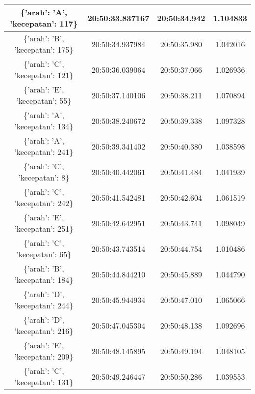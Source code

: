\begin{longtable}{|ccc|c|}
    \multicolumn{1}{|c|}{\{'arah': 'A', 'kecepatan': 117\}} & \multicolumn{1}{c|}{20:50:33.837167} & 20:50:34.942       & 1.104833    \\ \hline
    \multicolumn{1}{|c|}{\{'arah': 'B', 'kecepatan': 175\}} & \multicolumn{1}{c|}{20:50:34.937984} & 20:50:35.980       & 1.042016    \\ \hline
    \multicolumn{1}{|c|}{\{'arah': 'C', 'kecepatan': 121\}} & \multicolumn{1}{c|}{20:50:36.039064} & 20:50:37.066       & 1.026936    \\ \hline
    \multicolumn{1}{|c|}{\{'arah': 'E', 'kecepatan': 55\}}  & \multicolumn{1}{c|}{20:50:37.140106} & 20:50:38.211       & 1.070894    \\ \hline
    \multicolumn{1}{|c|}{\{'arah': 'A', 'kecepatan': 134\}} & \multicolumn{1}{c|}{20:50:38.240672} & 20:50:39.338       & 1.097328    \\ \hline
    \multicolumn{1}{|c|}{\{'arah': 'A', 'kecepatan': 241\}} & \multicolumn{1}{c|}{20:50:39.341402} & 20:50:40.380       & 1.038598    \\ \hline
    \multicolumn{1}{|c|}{\{'arah': 'C', 'kecepatan': 8\}}   & \multicolumn{1}{c|}{20:50:40.442061} & 20:50:41.484       & 1.041939    \\ \hline
    \multicolumn{1}{|c|}{\{'arah': 'C', 'kecepatan': 242\}} & \multicolumn{1}{c|}{20:50:41.542481} & 20:50:42.604       & 1.061519    \\ \hline
    \multicolumn{1}{|c|}{\{'arah': 'E', 'kecepatan': 251\}} & \multicolumn{1}{c|}{20:50:42.642951} & 20:50:43.741       & 1.098049    \\ \hline
    \multicolumn{1}{|c|}{\{'arah': 'C', 'kecepatan': 65\}}  & \multicolumn{1}{c|}{20:50:43.743514} & 20:50:44.754       & 1.010486    \\ \hline
    \multicolumn{1}{|c|}{\{'arah': 'B', 'kecepatan': 184\}} & \multicolumn{1}{c|}{20:50:44.844210} & 20:50:45.889       & 1.044790    \\ \hline
    \multicolumn{1}{|c|}{\{'arah': 'D', 'kecepatan': 244\}} & \multicolumn{1}{c|}{20:50:45.944934} & 20:50:47.010       & 1.065066    \\ \hline
    \multicolumn{1}{|c|}{\{'arah': 'D', 'kecepatan': 216\}} & \multicolumn{1}{c|}{20:50:47.045304} & 20:50:48.138       & 1.092696    \\ \hline
    \multicolumn{1}{|c|}{\{'arah': 'E', 'kecepatan': 209\}} & \multicolumn{1}{c|}{20:50:48.145895} & 20:50:49.194       & 1.048105    \\ \hline
    \multicolumn{1}{|c|}{\{'arah': 'C', 'kecepatan': 131\}} & \multicolumn{1}{c|}{20:50:49.246447} & 20:50:50.286       & 1.039553    \\ \hline

\end{longtable}
